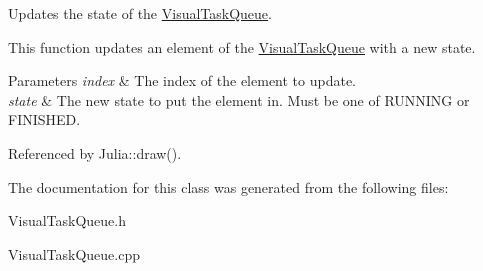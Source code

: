 Updates the state of the \hyperlink{classtsgl_1_1_visual_task_queue}{Visual\+Task\+Queue}. 

This function updates an element of the \hyperlink{classtsgl_1_1_visual_task_queue}{Visual\+Task\+Queue} with a new state. 
\begin{DoxyParams}{Parameters}
{\em index} & The index of the element to update. \\
\hline
{\em state} & The new state to put the element in. Must be one of R\+U\+N\+N\+I\+NG or F\+I\+N\+I\+S\+H\+ED. \\
\hline
\end{DoxyParams}


Referenced by Julia\+::draw().



The documentation for this class was generated from the following files\+:\begin{DoxyCompactItemize}
\item 
Visual\+Task\+Queue.\+h\item 
Visual\+Task\+Queue.\+cpp\end{DoxyCompactItemize}
